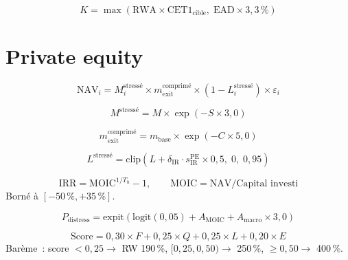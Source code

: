 \documentclass[10pt, a4paper, oneside]{report}
\theoremstyle{definition}
\begin{document}
\begin{equation}
K = \max(\text{RWA} \times \text{CET1}_{\text{cible}},\; \text{EAD} \times 3{,}3\,\%)
\label{eq:leverage-floor}
\end{equation}


\section{Private equity}
\label{sec:annexe:pe}

\begin{equation}
\text{NAV}_i = M_i^{\text{stressé}} \times m_{\text{exit}}^{\text{comprimé}} \times (1 - L_i^{\text{stressé}}) \times \varepsilon_i
\label{eq:nav}
\end{equation}

\begin{equation}
M^{\text{stressé}} = M \times \exp(-S \times 3{,}0)
\label{eq:metric-stress}
\end{equation}

\begin{equation}
m_{\text{exit}}^{\text{comprimé}} = m_{\text{base}} \times \exp(-C \times 5{,}0)
\label{eq:multiple-compression}
\end{equation}

\begin{equation}
L^{\text{stressé}} = \text{clip}(L + \delta_{\text{IR}} \cdot s^{\text{PE}}_{\text{IR}} \times 0{,}5, \; 0, \; 0{,}95)
\label{eq:leverage-stress}
\end{equation}

\begin{equation}
\text{IRR} = \text{MOIC}^{1/T_h} - 1, \qquad \text{MOIC} = \text{NAV} / \text{Capital investi}
\label{eq:irr}
\end{equation}
Borné à $[-50\,\%, +35\,\%]$.

\begin{equation}
P_{\text{distress}} = \text{expit}\!\left(\text{logit}(0{,}05) + A_{\text{MOIC}} + A_{\text{macro}} \times 3{,}0\right)
\label{eq:p-distress}
\end{equation}

\begin{equation}
\text{Score} = 0{,}30 \times F + 0{,}25 \times Q + 0{,}25 \times L + 0{,}20 \times E
\label{eq:pe-rw-score}
\end{equation}
Barème~: score $< 0{,}25 \to$ RW 190\,\%, $[0{,}25, 0{,}50) \to$ 250\,\%, $\geq 0{,}50 \to$ 400\,\%.
\end{document}
